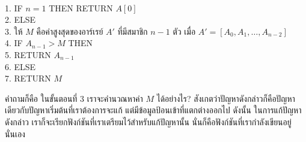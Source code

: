 \begin{algt}
\label{}
\\
1.\settowidth{\algbackindent}{1.}\hspace*{-\algbackindent}\hspace*{0.2in} IF $n=1$ THEN RETURN $A[0]$\\
2.\settowidth{\algbackindent}{2.}\hspace*{-\algbackindent}\hspace*{0.2in} ELSE\\
3.\settowidth{\algbackindent}{3.}\hspace*{-\algbackindent}\hspace*{0.2in}\hspace*{0.2in} ให้ $M$ คือ{\wbr}ค่าสูงสุด{\wbr}ของ{\wbr}อาร์เรย์ $A'$ ที่{\wbr}มี{\wbr}สมาชิก $n-1$ ตัว เมื่อ $A' = [A_0,A_1,\ldots,A_{n-2}]$\\
4.\settowidth{\algbackindent}{4.}\hspace*{-\algbackindent}\hspace*{0.2in}\hspace*{0.2in} IF $A_{n-1} > M$ THEN \\
5.\settowidth{\algbackindent}{5.}\hspace*{-\algbackindent}\hspace*{0.2in}\hspace*{0.2in}\hspace*{0.2in} RETURN $A_{n-1}$\\
6.\settowidth{\algbackindent}{6.}\hspace*{-\algbackindent}\hspace*{0.2in}\hspace*{0.2in} ELSE\\
7.\settowidth{\algbackindent}{7.}\hspace*{-\algbackindent}\hspace*{0.2in}\hspace*{0.2in}\hspace*{0.2in} RETURN $M$
\end{algt}

คำถาม{\wbr}ก็{\wbr}คือ ใน{\wbr}ขั้นตอน{\wbr}ที่ 3 เรา{\wbr}จะ{\wbr}คำนวณ{\wbr}หา{\wbr}ค่า $M$ ได้{\wbr}อย่างไร?
สังเกต{\wbr}ว่า{\wbr}ปัญหา{\wbr}ดังกล่าว{\wbr}ก็{\wbr}คือ{\wbr}ปัญหา{\wbr}เดียวกับ{\wbr}ปัญหา{\wbr}เริ่มต้น{\wbr}ที่{\wbr}เรา{\wbr}ต้องการ{\wbr}จะ{\wbr}แก้{\wbr}
แต่{\wbr}มี{\wbr}ข้อมูล{\wbr}ป้อน{\wbr}เข้าที่{\wbr}แตกต่าง{\wbr}ออก{\wbr}ไป ดังนั้น ใน{\wbr}การ{\wbr}แก้{\wbr}ปัญหา{\wbr}ดังกล่าว{\wbr}
เรา{\wbr}ก็{\wbr}จะ{\wbr}เรียก{\wbr}ฟังก์ชัน{\wbr}ที่{\wbr}เรา{\wbr}เตรียม{\wbr}ไว้{\wbr}สำหรับ{\wbr}แก้{\wbr}ปัญหา{\wbr}นั้น นั่น{\wbr}ก็{\wbr}คือ{\wbr}ฟังก์ชัน{\wbr}ที่{\wbr}เรา{\wbr}กำลัง{\wbr}เขียน{\wbr}อยู่{\wbr}นั่นเอง{\wbr}

